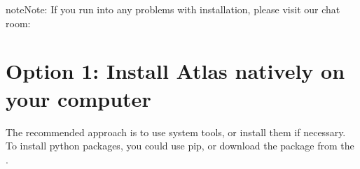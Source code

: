 \documentclass[letterpaper,10pt,english]{sphinxmanual}
\begin{document}
\begin{sphinxadmonition}{note}{Note:}
If you run into any problems with installation, please visit our chat room:
\end{sphinxadmonition}


\section{Option 1: Install Atlas natively on your computer}
\label{\detokenize{Installation:option-1-install-atlas-natively-on-your-computer}}
The recommended approach is to use system tools, or install them if
necessary. To install python packages, you could use pip, or download
the package from the .
\end{document}
